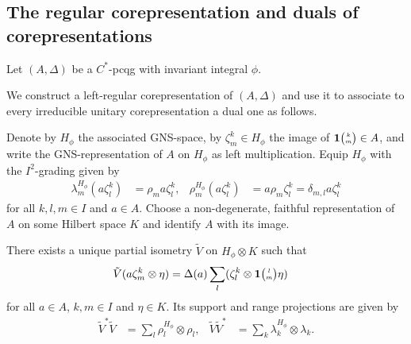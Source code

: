 \subsection{The regular  corepresentation and duals of corepresentations}
\label{subsection:reg-corep}
Let $(A,\Delta)$ be a $C^{*}$-pcqg with invariant integral $\phi$.

We  construct a left-regular corepresentation of $(A,\Delta)$ and
use it to associate to every irreducible unitary corepresentation a
dual one as follows.

 
 Denote by $H_{\phi}$ the associated GNS-space, by $\zeta^k_m \in H_{\phi}$ the image of $\mathbf{1}{\tiny {\begin{pmatrix} k\\m\end{pmatrix}}}
 \in A$, and write the GNS-representation of $A$ on $H_{\phi}$ as left multiplication.   Equip
 $H_{\phi}$ with the $I^{2}$-grading given by
 \begin{align*}
   \lambda^{H_{\phi}}_{m}  (a\zeta^{k}_{l}) &=  \rho_{m}a \zeta^{k}_{l}, &
   \rho^{H_{\phi}}_{m} (a\zeta^{k}_{l}) &= a\rho_{m} \zeta^{k}_{l} = \delta_{m,l} a\zeta^{k}_{l}
 \end{align*}
 for all $k,l,m\in I$ and $a\in A$.
 Choose a non-degenerate, faithful representation of $A$ on some Hilbert space $K$ and identify $A$
 with its image.
 \begin{Lem}\label{lem:reg-corep-pi}
   There exists a unique partial isometry $\tilde V$ on $H_{\phi} \otimes
   K$ such
   that
   \begin{align} \label{eq:regular-corep-pi}
     \tilde V(a \zeta^k_m \otimes \eta) &=
     \Delta(a) \sum_{l}(\zeta^{k}_{l} \otimes \mathbf{1}{\tiny {\begin{pmatrix} l\\m\end{pmatrix}}}\eta)
   \end{align}
   for all $a\in A$, $k,m\in I$ and $\eta\in K$. Its support and range
   projections are given by
   \begin{align*}
     \tilde V^{*}\tilde V &= \sum_{l} \rho^{H_{\phi}}_{l} \otimes \rho_{l}, &
     \tilde V \tilde V^{*} &= \sum_{k} \lambda^{H_{\phi}}_{k} \otimes \lambda_{k}.
   \end{align*}
 \end{Lem}
